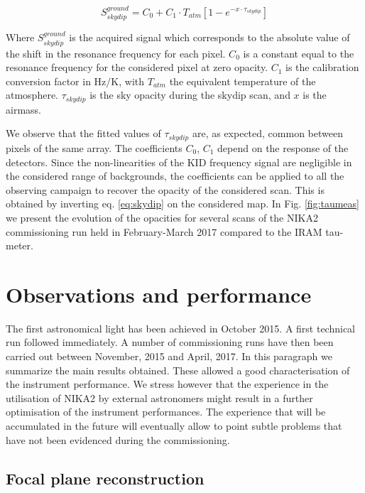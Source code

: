 \documentclass[]{aa} %
\begin{document}
\begin{equation}\label{eq:skydip}
S^{ground}_{skydip} = C_0 + C_1 \cdot T_{atm}[1 - e^{- x \cdot \tau_{skydip}}]
\end{equation}

Where $S^{ground}_{skydip}$ is the acquired signal which corresponds to the
absolute value of the shift in the resonance frequency for each pixel. $C_0$ is a constant equal to the resonance frequency for the considered pixel at zero opacity. $C_1$ is the calibration conversion factor in $\mathrm{Hz/K}$, with $T_{atm}$ the equivalent temperature of the
atmosphere. $\tau_{skydip}$ is the sky opacity during the skydip scan, and $x$ is the airmass.

We observe that the fitted values of $\tau_{skydip}$ are, as expected, common between pixels of the same array. The coefficients  $C_0$, $C_1$ depend on the response of the detectors. Since the non-linearities of the KID frequency signal are negligible in the considered range of backgrounds, the coefficients can be applied to all the observing campaign to recover the opacity of the considered scan. This is obtained by inverting eq. \ref{eq:skydip} on the considered map. In Fig. \ref{fig:taumeas} we present the evolution of the opacities for several scans of the NIKA2 commissioning run held in February-March 2017 compared to the IRAM tau-meter.


\section{Observations and performance}

The first astronomical light has been achieved in October 2015. A first technical run followed immediately. A number of commissioning runs have then been carried out between November, 2015 and April, 2017. In this paragraph we summarize the main results obtained. These allowed a good characterisation of the instrument performance. We stress however that the experience in the utilisation of NIKA2 by external astronomers might result in a further optimisation of the instrument performances. The experience that will be accumulated in the future will eventually allow to point subtle problems that have not been evidenced during the commissioning. 

\subsection{Focal plane reconstruction}
\end{document}
